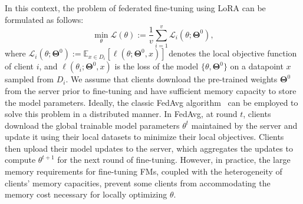 \documentclass[sigconf]{acmart}
\begin{document}
%
In this context, the problem of federated fine-tuning using LoRA can be formulated as follows:
\begin{equation}\label{eq:ffm_obj}
\min_{\boldsymbol{\mathcal{\theta}}} \mathcal{L}(\boldsymbol{\mathcal{\theta}}) := \frac{1}{v}\sum_{i=1}^{v} \mathcal{L}_{i}(\boldsymbol{\mathcal{\theta}}; \boldsymbol{\Theta}^0),
\end{equation}
where $\mathcal{L}_{i}(\boldsymbol{\mathcal{\theta}}; \boldsymbol{\Theta}^0) := \mathbb{E}_{x \in  D_i}[\ell(\boldsymbol{\mathcal{\theta}};\boldsymbol{\Theta}^0,x)]$ denotes the local objective function of client $i$, and $\ell(\boldsymbol{\mathcal{\theta}}_i;\boldsymbol{\Theta}^0,x)$ is the loss of the model $\{\boldsymbol{\mathcal{\theta}}, \boldsymbol{\Theta}^0 \}$ on a datapoint $x$ sampled from ${D}_i$. 
% 
We assume that clients download the pre-trained weights $\boldsymbol{\Theta}^0$ from the server prior to fine-tuning and have sufficient memory capacity to store the model parameters. Ideally, the classic FedAvg algorithm~\cite{mcmahan2017communication} can be employed to solve this problem in a distributed manner. In FedAvg, at round $t$, clients download the global trainable model parameters $\boldsymbol{\mathcal{\theta}}^t$ maintained by the server and update it using their local datasets to minimize their local objectives. Clients then upload their model updates to the server, which aggregates the updates to compute $\boldsymbol{\mathcal{\theta}}^{t+1}$ for the next round of fine-tuning. 
% 
However, in practice, the large memory requirements for fine-tuning FMs, coupled with the heterogeneity of clients' memory capacities, prevent some clients from accommodating the memory cost necessary for locally optimizing $\boldsymbol{\mathcal{\theta}}$. %

\end{document}
